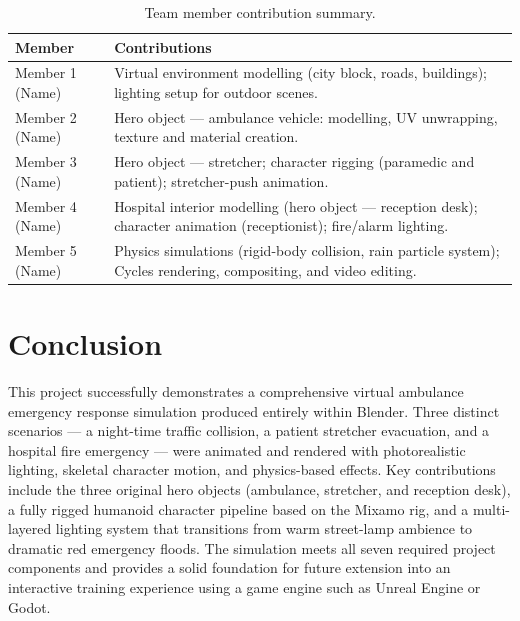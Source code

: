 \documentclass[10pt, twocolumn]{article}
\begin{document}
\begin{table}[H]
  \centering
  \caption{Team member contribution summary.}
  \label{tab:contributions}
  \renewcommand{\arraystretch}{1.2}
  \begin{tabular}{p{2.0cm} p{4.5cm}}
    \toprule
    \textbf{Member} & \textbf{Contributions} \\
    \midrule
    Member 1 (Name) & Virtual environment modelling (city block, roads, buildings);
                      lighting setup for outdoor scenes. \\
    \addlinespace
    Member 2 (Name) & Hero object — ambulance vehicle: modelling, UV unwrapping,
                      texture and material creation. \\
    \addlinespace
    Member 3 (Name) & Hero object — stretcher; character rigging (paramedic
                      and patient); stretcher-push animation. \\
    \addlinespace
    Member 4 (Name) & Hospital interior modelling (hero object — reception desk);
                      character animation (receptionist); fire/alarm lighting. \\
    \addlinespace
    Member 5 (Name) & Physics simulations (rigid-body collision, rain particle system);
                      Cycles rendering, compositing, and video editing. \\
    \bottomrule
  \end{tabular}
\end{table}

\section{Conclusion}
\label{sec:conclusion}

This project successfully demonstrates a comprehensive virtual ambulance emergency
response simulation produced entirely within Blender.
Three distinct scenarios — a night-time traffic collision, a patient stretcher
evacuation, and a hospital fire emergency — were animated and rendered with
photorealistic lighting, skeletal character motion, and physics-based effects.
Key contributions include the three original hero objects (ambulance, stretcher,
and reception desk), a fully rigged humanoid character pipeline based on the
Mixamo rig, and a multi-layered lighting system that transitions from warm
street-lamp ambience to dramatic red emergency floods.
The simulation meets all seven required project components and provides a solid
foundation for future extension into an interactive training experience using
a game engine such as Unreal Engine or Godot.
\end{document}
